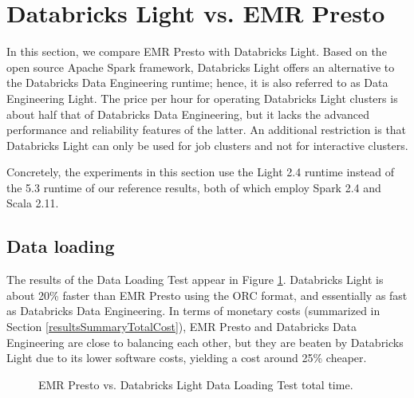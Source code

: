 \section{Databricks Light vs. EMR Presto}\label{databricksLight}

In this section, we compare EMR Presto with Databricks Light. Based on the open source Apache Spark framework, Databricks Light offers an alternative to the Databricks Data Engineering runtime; hence, it is also referred to as Data Engineering Light. The price per hour for operating Databricks Light clusters is about half that of Databricks Data Engineering, but it lacks the advanced performance and reliability features of the latter. An additional restriction is that Databricks Light can only be used for job clusters and not for interactive clusters.

Concretely, the experiments in this section use the Light 2.4 runtime instead of the 5.3 runtime of our reference results, both of which employ Spark 2.4 and Scala 2.11.

\subsection{Data loading}

The results of the Data Loading Test appear in Figure \ref{fig:prestoVsDatabricksLightDataLoadingTotalTime}. Databricks Light is about 20\% faster than EMR Presto using the ORC format, and essentially as fast as Databricks Data Engineering. In terms of monetary costs (summarized in Section \ref{resultsSummaryTotalCost}), EMR Presto and Databricks Data Engineering are close to balancing each other, but they are beaten by Databricks Light due to its lower software costs, yielding a cost around 25\% cheaper.

\begin{figure}
   \begin{center}
   \end{center}
   \caption{EMR Presto vs. Databricks Light Data Loading Test total time.}
   \label{fig:prestoVsDatabricksLightDataLoadingTotalTime}
\end{figure}

